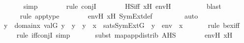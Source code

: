 \begin{isabellebody}
\ \ \ \ \ \ \ \isamarkupfalse%
\ simp\isanewline
\ \ \ \ \ \ \ \isamarkupfalse%
{\isacharparenleft}{\kern0pt}rule\ conjI{\isacharparenright}{\kern0pt}\isanewline
\ \ \ \ \ \ \isamarkupfalse%
\ HS{\isacharunderscore}{\kern0pt}iff\ x{\isacharprime}{\kern0pt}H\ env{\isacharprime}{\kern0pt}H\isanewline
\ \ \ \ \ \ \ \ \isamarkupfalse%
\ blast\isanewline
\ \ \ \ \ \ \ \isamarkupfalse%
{\isacharparenleft}{\kern0pt}rule\ app{\isacharunderscore}{\kern0pt}type{\isacharparenright}{\kern0pt}\isanewline
\ \ \ \ \ \ \isamarkupfalse%
\ env{\isacharprime}{\kern0pt}H\ x{\isacharprime}{\kern0pt}H\ SymExt{\isacharunderscore}{\kern0pt}def\ \isanewline
\ \ \ \ \ \ \isamarkupfalse%
\ auto\isanewline
\ \ \ \ \isamarkupfalse%
\ \isamarkupfalse%
\ {\isachardoublequoteopen}{\isachardot}{\kern0pt}{\isachardot}{\kern0pt}{\isachardot}{\kern0pt}\ {\isasymlongleftrightarrow}\ {\isacharparenleft}{\kern0pt}{\isasymexists}y{\isacharprime}{\kern0pt}\ {\isasymin}\ domain{\isacharparenleft}{\kern0pt}x{\isacharprime}{\kern0pt}{\isacharparenright}{\kern0pt}{\isachardot}{\kern0pt}\ val{\isacharparenleft}{\kern0pt}G{\isacharcomma}{\kern0pt}\ y{\isacharprime}{\kern0pt}{\isacharparenright}{\kern0pt}\ {\isacharequal}{\kern0pt}\ y\ {\isasymand}\ y\ {\isasymin}\ x\ {\isasymand}\ sats{\isacharparenleft}{\kern0pt}SymExt{\isacharparenleft}{\kern0pt}G{\isacharparenright}{\kern0pt}{\isacharcomma}{\kern0pt}\ {\isasymphi}{\isacharcomma}{\kern0pt}\ {\isacharbrackleft}{\kern0pt}y{\isacharbrackright}{\kern0pt}\ {\isacharat}{\kern0pt}\ env\ {\isacharat}{\kern0pt}\ {\isacharbrackleft}{\kern0pt}x{\isacharbrackright}{\kern0pt}{\isacharparenright}{\kern0pt}{\isacharparenright}{\kern0pt}{\isachardoublequoteclose}\isanewline
\ \ \ \ \ \ \isamarkupfalse%
{\isacharparenleft}{\kern0pt}rule\ bex{\isacharunderscore}{\kern0pt}iff{\isacharparenright}{\kern0pt}\isanewline
\ \ \ \ \ \ \isamarkupfalse%
{\isacharparenleft}{\kern0pt}rule\ iff{\isacharunderscore}{\kern0pt}conjI{}{\isacharcomma}{\kern0pt}\ simp{\isacharparenright}{\kern0pt}{\isacharplus}{\kern0pt}\isanewline
\ \ \ \ \ \ \isamarkupfalse%
{\isacharparenleft}{\kern0pt}subst\ map{\isacharunderscore}{\kern0pt}app{\isacharunderscore}{\kern0pt}distrib{\isacharbrackleft}{\kern0pt}\ A{\isacharequal}{\kern0pt}HS{\isacharbrackright}{\kern0pt}{\isacharparenright}{\kern0pt}\isanewline
\ \ \ \ \ \ \isamarkupfalse%
\ env{\isacharprime}{\kern0pt}H\ x{\isacharprime}{\kern0pt}H\ \isanewline

\end{isabellebody}

